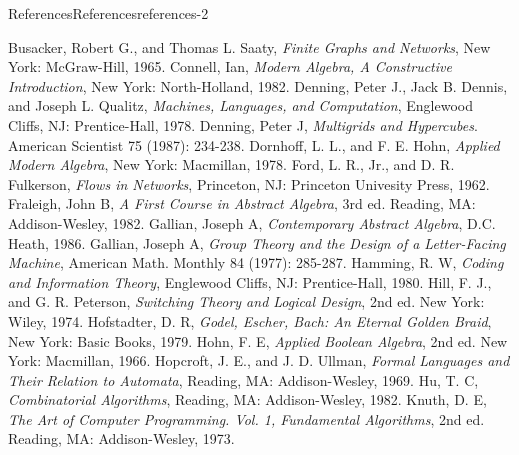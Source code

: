 \documentclass[twoside,10pt,]{book}
\numberwithin{equation}{section}
\begin{document}
\begin{references-chapter-numberless}{References}{}{References}{}{}{references-2}
\begin{referencelist}
\hypertarget{busacker-1965}{}Busacker, Robert G., and Thomas L. Saaty, \textit{Finite Graphs and Networks}, New York: McGraw-Hill, 1965.
\hypertarget{biblio-connell-1982}{}Connell, Ian, \textit{Modern Algebra, A Constructive Introduction}, New York: North-Holland, 1982.
\hypertarget{biblio-denning-1978}{}Denning, Peter J., Jack B. Dennis, and Joseph L. Qualitz, \textit{Machines, Languages, and Computation}, Englewood Cliffs, NJ: Prentice-Hall, 1978.
\hypertarget{biblio-denning-1987}{}Denning, Peter J, \textit{Multigrids and Hypercubes}. American Scientist 75 (1987): 234-238.
\hypertarget{biblio-dornhoff-1978}{}Dornhoff, L. L., and F. E. Hohn, \textit{Applied Modern Algebra}, New York: Macmillan, 1978.
\hypertarget{biblio-ford-1962}{}Ford, L. R., Jr., and D. R. Fulkerson, \textit{Flows in Networks},  Princeton, NJ: Princeton Univesity Press, 1962.
\hypertarget{biblio-fraleigh-1982}{}Fraleigh, John B, \textit{A First Course in Abstract Algebra}, 3rd ed. Reading, MA: Addison-Wesley, 1982.
\hypertarget{biblio-gallian-1986}{}Gallian, Joseph A, \textit{Contemporary Abstract Algebra}, D.C. Heath, 1986.
\hypertarget{biblio-gallian-1977}{}Gallian, Joseph A, \textit{Group Theory and the Design of a Letter-Facing Machine}, American Math. Monthly 84 (1977): 285-287.
\hypertarget{biblio-hamming-1980}{}Hamming, R. W, \textit{Coding and Information Theory}, Englewood Cliffs, NJ: Prentice-Hall, 1980.
\hypertarget{biblio-hill-1974}{}Hill, F. J., and G. R. Peterson, \textit{Switching Theory and Logical Design}, 2nd ed. New York: Wiley, 1974.
\hypertarget{biblio-hofstadter-1979}{}Hofstadter, D. R, \textit{Godel, Escher, Bach: An Eternal Golden Braid}, New York: Basic Books, 1979.
\hypertarget{biblio-hohn-1966}{}Hohn, F. E, \textit{Applied Boolean Algebra}, 2nd ed. New York: Macmillan, 1966.
\hypertarget{biblio-hopcroft-1969}{}Hopcroft, J. E., and J. D. Ullman,  \textit{Formal Languages and Their Relation to Automata}, Reading, MA: Addison-Wesley, 1969.
\hypertarget{biblio-hu-1982}{}Hu, T. C, \textit{Combinatorial Algorithms}, Reading, MA: Addison-Wesley, 1982.
\hypertarget{biblio-knuth-1978}{}Knuth, D. E, \textit{The Art of Computer Programming. Vol. 1, Fundamental Algorithms}, 2nd ed. Reading, MA: Addison-Wesley, 1973.

\end{referencelist}
\end{references-chapter-numberless}
\end{document}

